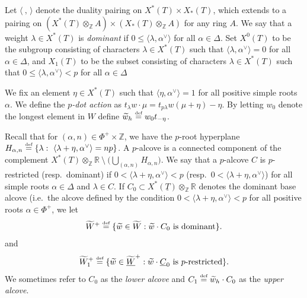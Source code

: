 \documentclass[oneside,a4paper,english, 11pt]{amsart}
\theoremstyle{plain}
\theoremstyle{plain}
\theoremstyle{plain}
\theoremstyle{plain}
\theoremstyle{plain}
\theoremstyle{plain}
\theoremstyle{definition}
\theoremstyle{definition}
\theoremstyle{definition}
\theoremstyle{remark}
\numberwithin{equation}{section}
\newcommand{\Z}{\mathbb{Z}}
\newcommand{\R}{\mathbb{R}}
\newcommand{\un}[1]{\underline{#1}}
\newcommand{\tld}[1]{\widetilde{#1}}
\newcommand{\defeq}{\stackrel{\textrm{\tiny{def}}}{=}}
\begin{document}
Let $\langle \ ,\,\rangle$ denote the duality pairing on $X^*(T)\times X_*(T)$, which extends to a pairing on $(X^*(T)\otimes_{\Z}A)\times (X_*(T)\otimes_{\Z}A)$ for any ring $A$.
We say that a weight $\lambda\in X^*(T)$ is \emph{dominant} if $0\leq \langle\lambda,\alpha^\vee\rangle$  for all $\alpha\in \Delta$.
Set $X^0(T)$ to be the subgroup consisting of characters $\lambda\in X^*(T)$ such that $\langle\lambda,\alpha^\vee\rangle=0$ for all $\alpha\in \Delta$, and $X_1(T)$ to be the subset consisting of characters $\lambda\in X^*(T)$ such that $0\leq \langle\lambda,\alpha^\vee\rangle< p$ for all $\alpha\in \Delta$


We fix an element $\eta\in X^*(T)$ such that $\langle \eta,\alpha^\vee\rangle = 1$ for all positive simple roots $\alpha$.
We define the \emph{$p$-dot action} as $t_\lambda w \cdot \mu = t_{p\lambda} w (\mu+\eta) - \eta$.
By letting $w_0$ denote the longest element in $W$ define $\tld{w}_h\defeq w_0 t_{-\eta}$.



Recall that for $(\alpha,n)\in \Phi^+\times \Z$, we have the $p$-root hyperplane $H_{\alpha,n}\defeq \{\lambda:\ \langle\lambda+\eta,\alpha^\vee\rangle=np\}$. A $p$-alcove is a connected component of  
the complement $X^*(T)\otimes_{\Z}\R\ \setminus\ \big(\bigcup_{(\alpha,n)}H_{\alpha,n}\big)$.
We say that a $p$-alcove $C$ is $p$-restricted (resp.~dominant) if $0<\langle\lambda+\eta,\alpha^\vee\rangle<p$ (resp.~$0<\langle\lambda+\eta,\alpha^\vee\rangle$) for all simple roots $\alpha\in \Delta$ and $\lambda\in C$.
%
If $C_0 \subset X^*(\un{T})\otimes_{\Z}\R$ denotes the dominant base alcove (i.e.~the alcove defined by the condition $0<\langle\lambda+\eta,\alpha^\vee\rangle<p$ for all positive roots $\alpha\in \Phi^+$, we let 
\[\tld{W}^+\defeq\{\tld{w}\in \tld{W}:\tld{w}\cdot C_0 \textrm{ is dominant}\}.\]
and
\[\tld{W}^+_1\defeq\{\tld{w}\in \tld{\un{W}}^+:\tld{w}\cdot \un{C}_0 \textrm{ is } p\textrm{-restricted}\}.\]
We sometimes refer to $C_0$ as the \emph{lower alcove} and $C_1\defeq \tld{w}_h\cdot C_0$ as the \emph{upper alcove}.

%
\end{document}
